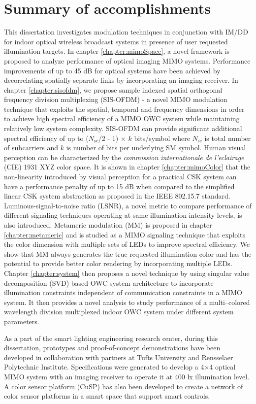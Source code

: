 \section{Summary of accomplishments}
\label{sec:accomplishments}
\graphicspath{{_Intro/Figures/}}

This dissertation investigates modulation techniques in conjunction with IM/DD for indoor optical wireless broadcast systems in presence of user requested illumination targets. In chapter \ref{chapter:mimoSpace}, a novel framework is proposed to analyze performance of optical imaging MIMO systems. Performance improvements of up to 45 dB for optical systems have been achieved by decorrelating spatially separate links by incorporating an imaging receiver. In chapter \ref{chapter:sisofdm}, we propose sample indexed spatial orthogonal frequency division multiplexing (SIS-OFDM) - a novel MIMO modulation technique that exploits the spatial, temporal and frequency dimensions in order to achieve high spectral efficiency of a MIMO OWC system while maintaining relatively low system complexity. SIS-OFDM can provide significant additional spectral efficiency of up to ($N_{\text{sc}}$/2 - 1) $\times$ $k$ bits/symbol where $N_{\text{sc}}$ is total number of subcarriers and $k$ is number of bits per underlying SM symbol. Human visual perception can be characterized by the \textit{commission internationale de l'eclairage} (CIE) 1931 XYZ color space. It is shown in chapter \ref{chapter:mimoColor} that the non-linearity introduced by visual perception for a practical CSK system can have a performance penalty of up to 15 dB when compared to the simplified linear CSK system abstraction as proposed in the IEEE 802.15.7 standard. Luminous-signal-to-noise ratio (LSNR), a novel metric to compare performance of different signaling techniques operating at same illumination intensity levels, is also introduced. Metameric modulation (MM) is proposed in chapter \ref{chapter:metameric} and is studied as a MIMO signaling technique that exploits the color dimension with multiple sets of LEDs to improve spectral efficiency. We show that MM always generates the true requested illumination color and has the potential to provide better color rendering by incorporating multiple LEDs. Chapter \ref{chapter:system} then proposes a novel technique by using singular value decomposition (SVD) based OWC system architecture to incorporate illumination constraints independent of communication constraints in a MIMO system. It then provides a novel analysis to study performance of a multi--colored wavelength division multiplexed indoor OWC system under different system parameters.

As a part of the smart lighting engineering research center, during this dissertation, prototypes and proof-of-concept demonstrations have been developed in collaboration with partners at Tufts University and Rensselaer Polytechnic Institute. Specifications were generated to develop a 4$\times$4 optical MIMO system with an imaging receiver to operate it at 400 lx illumination level. A color sensor platform (CuSP) has also been developed to create a network of color sensor platforms in a smart space that support smart controls.